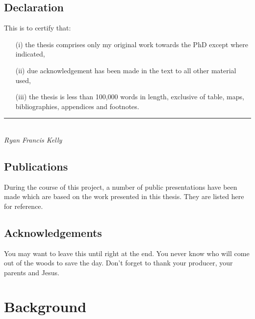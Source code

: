 \documentclass[a4paper,twoside,12pt]{book}
\begin{document}
\chapter*{Declaration}
This is to certify that:
\begin{itemize}
\item[(i)] the thesis comprises only my original work towards the PhD except where indicated,
\item[(ii)] due acknowledgement has been made in the text to all other material used,
\item[(iii)] the thesis is less than 100,000 words in length, exclusive of table, maps, bibliographies,
appendices and footnotes.
\end{itemize}
\vspace{3cm}
\rule{70mm}{0.1mm}\\
\emph{Ryan Francis Kelly}

\chapter*{Publications} %
During the course of this project, a number of public presentations have been made which are based on the work
presented in this thesis. They are listed here for reference.


\chapter*{Acknowledgements} %
You may want to leave this until right at the end. You never know who will come out of the woods to save the
day. Don't forget to thank your producer, your parents and Jesus.


\singlespace    %
\dominitoc
\tableofcontents
\listoftables   %
\listoffigures

\newpage
{}
\part{Background}

\singlespace

%


\end{document}
